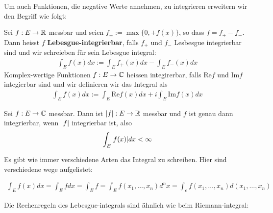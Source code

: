 Um auch Funktionen, die negative Werte annehmen, zu integrieren erweitern wir den Begriff wie folgt:

\begin{definition}[]
				Sei $f: E \to \mathbb{R}$ messbar und seien $f_{\pm} := \max\{0, \pm f(x)\}$, so dass $f = f_+ - f_-$. Dann heisst $f$ \textbf{Lebesgue-integrierbar}, falls $f_+$ und $f_-$ Lesbesgue integrierbar sind und wir schreieben für sein Lebesgue integral:
	\begin{align*}
					\int_E f(x) dx := \int_Ef_+(x) dx - \int_Ef_-(x)dx
	\end{align*}
	Komplex-wertige Funktionen $f: E \to \mathbb{C}$ heissen integirerbar, falls $\text{Re} f$ und $\text{Im}f$ integierbar sind und wir definieren wir das Integral als
	\begin{align*}
					\int_Ef(x)dx := \int_E \text{Re}f(x) dx + i \int_E \text{Im}f(x)dx
	\end{align*}
\end{definition}

\begin{lemma}[]
				Sei $f: E \to \mathbb{C}$ messbar. Dann ist $\vert f\vert: E \to \mathbb{R}$ messbar und $f$ ist genau dann integrierbar, wenn $\vert f\vert$ integrierbar ist, also
	\begin{align*}
					\int_E \abs{f(x)}dx < \infty
	\end{align*}
\end{lemma}
Es gibt wie immer verschiedene Arten das Integral zu schreiben. Hier sind verschiedene wege aufgelistet:

\begin{align*}
				\int_E f(x) dx = \int_E f dx = \int_E f = \int_E f(x_1, \ldots, x_n) d^nx = \int_e f(x_1, \ldots, x_n) d(x_1, \ldots, x_n)
\end{align*}

Die Rechenregeln des Lebesgue-integrals sind ähnlich wie beim Riemann-integral:

